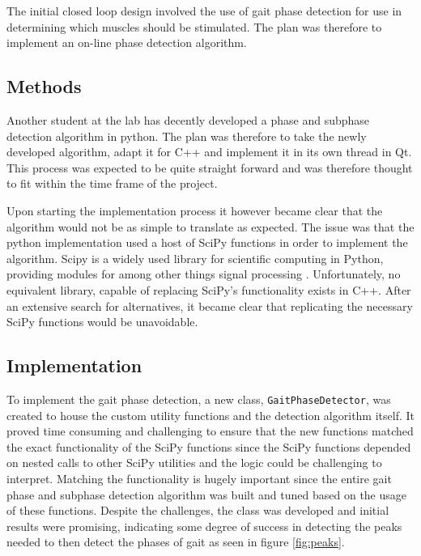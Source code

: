 

The initial closed loop design involved the use of gait phase detection for use in determining which muscles should be stimulated. The plan was therefore to implement an on-line phase detection algorithm.

\subsection{Methods}
Another student at the lab has decently developed a phase and subphase detection algorithm in python. The plan was therefore to take the newly developed algorithm, adapt it for C++ and implement it in its own thread in Qt. This process was expected to be quite straight forward and was therefore thought to fit within the time frame of the project.

Upon starting the implementation process it however became clear that the algorithm would not be as simple to translate as expected. The issue was that the python implementation used a host of SciPy \cite{noauthor_scipy_nodate} functions in order to implement the algorithm. Scipy is a  widely used library for scientific computing in Python, providing modules for among other things signal processing \cite{noauthor_scipy_nodate}. Unfortunately, no equivalent library, capable of replacing SciPy's functionality exists in C++. After an extensive search for alternatives, it became clear that replicating the necessary SciPy functions would be unavoidable.

\subsection{Implementation}
To implement the gait phase detection, a new class, \texttt{GaitPhaseDetector}, was created to house the custom utility functions and the detection algorithm itself. It proved time consuming and challenging to ensure that the new functions matched the exact functionality of the SciPy functions since the SciPy functions depended on nested calls to other SciPy utilities and the logic could be challenging to interpret. Matching the functionality is hugely important since the entire gait phase and subphase detection algorithm was built and tuned based on the usage of these functions. Despite the challenges, the class was developed and initial results were promising, indicating some degree of success in detecting the peaks needed to then detect the phases of gait as seen in figure \ref{fig:peaks}. 

